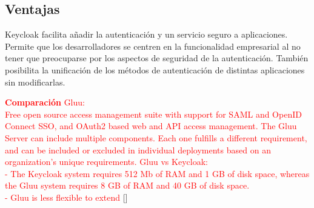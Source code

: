 	\subsection{Ventajas}
	Keycloak facilita añadir la autenticación y un servicio seguro a aplicaciones. Permite que los desarrolladores se centren en la funcionalidad empresarial al no tener que preocuparse por los aspectos de seguridad de la autenticación. También posibilita la unificación de los métodos de autenticación de distintas aplicaciones sin modificarlas.
	
	\textcolor{red}{\textbf{Comparación}}
	\textcolor{red}{Gluu: \\ Free open source access management suite with support for SAML and OpenID Connect SSO, and OAuth2 based web and API access management. The Gluu Server can include multiple components. Each one fulfills a different requirement, and can be included or excluded in individual deployments based on an organization’s unique requirements.}
	\textcolor{red}{Gluu vs Keycloak: \\
		- The Keycloak system requires 512 Mb of RAM and 1 GB of disk space, whereas the Gluu system requires 8 GB of RAM and 40 GB of disk space. \\ - Gluu is less flexible to extend} [\cite{vassallo2017continuous}]